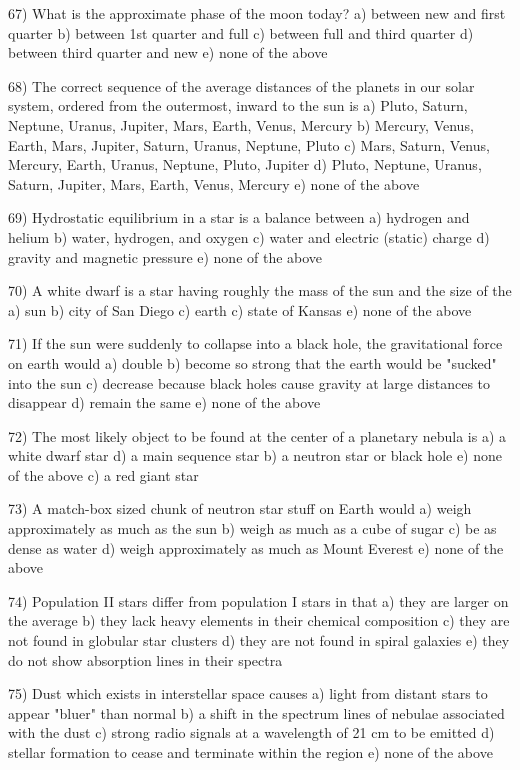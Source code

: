 67) What is the approximate phase of the moon today?
a) between new and first quarter
b) between 1st quarter and full
c) between full and third quarter
d) between third quarter and new
e) none of the above

68) The correct sequence of the average distances of the planets in our solar
system, ordered from the outermost, inward to the sun is
a) Pluto, Saturn, Neptune, Uranus, Jupiter, Mars, Earth, Venus, Mercury
b) Mercury, Venus, Earth, Mars, Jupiter, Saturn, Uranus, Neptune, Pluto
c) Mars, Saturn, Venus, Mercury, Earth, Uranus, Neptune, Pluto, Jupiter
d) Pluto, Neptune, Uranus, Saturn, Jupiter, Mars, Earth, Venus, Mercury
e) none of the above

69) Hydrostatic equilibrium in a star is a balance between
a) hydrogen and helium
b) water, hydrogen, and oxygen
c) water and electric (static) charge
d) gravity and magnetic pressure
e) none of the above

70) A white dwarf is a star having roughly the mass of the sun
and the size of the
a) sun b) city of San Diego c) earth c) state of Kansas
e) none of the above

71) If the sun were suddenly to collapse into a black hole,
the gravitational force on earth would
a) double
b) become so strong that the earth would be "sucked" into the sun
c) decrease because black holes cause gravity at large distances
to disappear
d) remain the same
e) none of the above

72) The most likely object to be found at the center of a planetary nebula is
a) a white dwarf star d) a main sequence star
b) a neutron star or black hole e) none of the above
c) a red giant star

73) A match-box sized chunk of neutron star stuff on Earth would
a) weigh approximately as much as the sun
b) weigh as much as a cube of sugar
c) be as dense as water
d) weigh approximately as much as Mount Everest
e) none of the above

74) Population II stars differ from population I stars in that
a) they are larger on the average
b) they lack heavy elements in their chemical composition
c) they are not found in globular star clusters
d) they are not found in spiral galaxies
e) they do not show absorption lines in their spectra

75) Dust which exists in interstellar space causes
a) light from distant stars to appear "bluer" than normal
b) a shift in the spectrum lines of nebulae associated with the dust
c) strong radio signals at a wavelength of 21 cm to be emitted
d) stellar formation to cease and terminate within the region
e) none of the above

